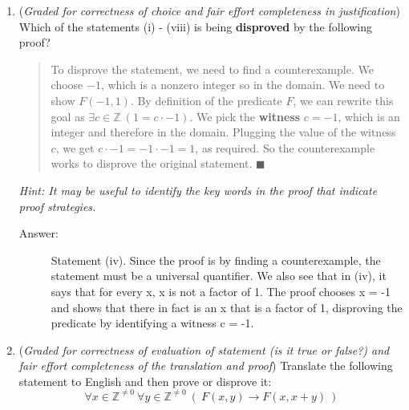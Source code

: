 \documentclass[12pt, oneside]{article}
\begin{document}
\begin{enumerate}
\begin{enumerate}
\begin{quote}
  \hfill $\blacksquare$
\end{quote}

{\it Hint: It may be useful to 
identify the key words in the proof that indicate proof strategies.}

\begin{description}
    \item[Answer:] Statement (vii). Taking the universal generalization of (vii) with arbitrary integer e as described in the proof gives $\exists x \in non-zero integer(F(x, e))$, which is equivalent to the statement to be shown true in the proof. Similarly, the predicate F from (vii) can be rewritten as shown in proof and we can choose witness $x = 1$ and $c = e$ to prove the statement true, proving the claim true.
\end{description}

\item ({\it Graded for correctness of choice and fair effort completeness in justification}) 
Which of the statements (i) - (viii) is being {\bf disproved} by the following proof? 

\begin{quote}
  To disprove the statement, we need to find a counterexample. We choose $-1$, which is a nonzero
  integer so in the domain. We need to show $ F(-1,1)$. By definition of the predicate $F$, we 
  can rewrite this goal as $\exists c \in \mathbb{Z}~(1 = c \cdot -1)$. We pick the {\bf witness} $c = -1$, 
  which is an integer and therefore in the domain. Plugging the value of the witness $c$, we get 
  $c \cdot -1 = -1 \cdot -1 = 1$, as required. So the counterexample works to 
  disprove the original statement.
  \hfill $\blacksquare$
\end{quote}

{\it Hint: It may be useful to 
identify the key words in the proof that indicate proof strategies.}

\begin{description}
    \item[Answer:] Statement (iv). Since the proof is by finding a counterexample, the statement must be a universal quantifier. We also see that in (iv), it says that for every x, x is not a factor of 1. The proof chooses x = -1 and shows that there in fact is an x that is a factor of 1, disproving the predicate by identifying a witness c = -1. 
\end{description}

\item ({\it Graded for correctness of evaluation of statement (is it true or false?) and fair effort completeness of the translation and proof}) Translate the following statement to English and then prove or disprove it:
$$\forall x \in \mathbb{Z}^{\neq 0}~ \forall y \in \mathbb{Z}^{\neq 0} ~(~F(x,y) \to F(x,x+y)~)$$


\end{enumerate}
\end{enumerate}
\end{document}
